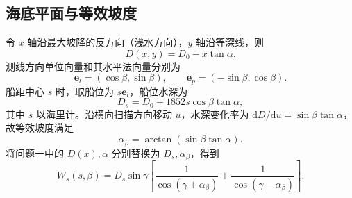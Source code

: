 \documentclass[withoutpreface,notoc]{cumcmthesis}
\begin{document}
\subsection{海底平面与等效坡度}
令 $x$ 轴沿最大坡降的反方向（浅水方向），$y$ 轴沿等深线，则
\begin{equation}
D(x,y)=D_0-x\tan\alpha.
\end{equation}
测线方向单位向量和其水平法向量分别为
\begin{equation}
\boldsymbol e_l=(\cos\beta,\sin\beta),\qquad
\boldsymbol e_p=(-\sin\beta,\cos\beta).
\end{equation}
船距中心 $s$ 时，取船位为 $s\boldsymbol e_l$，船位水深为
\begin{equation}\label{eq:depth2}
D_s=D_0-1852s\cos\beta\tan\alpha,
\end{equation}
其中 $s$ 以海里计。沿横向扫描方向移动 $u$，水深变化率为 $\mathrm dD/\mathrm du=\sin\beta\tan\alpha$，故等效坡度满足
\begin{equation}\label{eq:alphab}
\alpha_\beta=\arctan(\sin\beta\tan\alpha).
\end{equation}
将问题一中的 $D(x),\alpha$ 分别替换为 $D_s,\alpha_\beta$，得到
\begin{equation}\label{eq:q2width}
W_s(s,\beta)=D_s\sin\gamma\left[\frac1{\cos(\gamma+\alpha_\beta)}+\frac1{\cos(\gamma-\alpha_\beta)}\right].
\end{equation}
\end{document}
